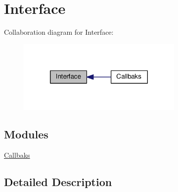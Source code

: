\hypertarget{group___i_r_c_interface}{\section{Interface}
\label{group___i_r_c_interface}
}
Collaboration diagram for Interface\-:
\nopagebreak
\begin{figure}[H]
\begin{center}
\leavevmode
\includegraphics[width=228pt]{group___i_r_c_interface}
\end{center}
\end{figure}
\subsection*{Modules}
\begin{DoxyCompactItemize}
\item 
\hyperlink{group___i_r_c_interface_callbacks}{Callbaks}
\end{DoxyCompactItemize}


\subsection{Detailed Description}

